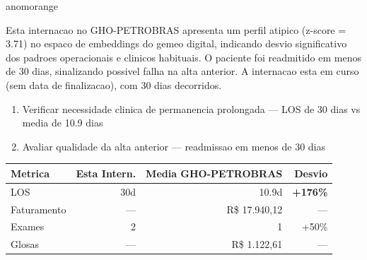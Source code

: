 \documentclass[a4paper,10pt]{article}
\begin{document}
\begin{anomalycard}[Internacao 166442 | GHO-PETROBRAS | ALTO (z=3.71)]{anomorange}
\vspace{2pt}\begin{tcolorbox}[colback=severityred!20,colframe=anomorange,title={\textbf{Interpretacao de Negocio}},fonttitle=\bfseries\small,left=4pt,right=4pt,top=3pt,bottom=3pt]
{\small Esta internacao no GHO-PETROBRAS apresenta um perfil atipico (z-score = 3.71) no espaco de embeddings do gemeo digital, indicando desvio significativo dos padroes operacionais e clinicos habituais. O paciente foi readmitido em menos de 30 dias, sinalizando possivel falha na alta anterior. A internacao esta em curso (sem data de finalizacao), com 30 dias decorridos.}
\end{tcolorbox}
\begin{tcolorbox}[colback=severityyellow!30,colframe=anomorange,title={\textbf{Recomendacoes Especificas}},fonttitle=\bfseries\small,left=4pt,right=4pt,top=3pt,bottom=3pt]
\begin{enumerate}[nosep,leftmargin=16pt]
\item {\small Verificar necessidade clinica de permanencia prolongada --- LOS de 30 dias vs media de 10.9 dias}
\item {\small Avaliar qualidade da alta anterior --- readmissao em menos de 30 dias}
\end{enumerate}
\end{tcolorbox}
\begin{center}\begin{tabular}{l r r r}\toprule\textbf{Metrica} & \textbf{Esta Intern.} & \textbf{Media GHO-PETROBRAS} & \textbf{Desvio} \\\midrule
LOS & 30d & 10.9d & \textcolor{anomred}{\textbf{+176\%}} \\
Faturamento & --- & R\$ 17.940,12 & --- \\
Exames & 2 & 1 & \textcolor{anomorange}{+50\%} \\
Glosas & --- & R\$ 1.122,61 & --- \\
\bottomrule\end{tabular}\end{center}


\end{anomalycard}
\end{document}

